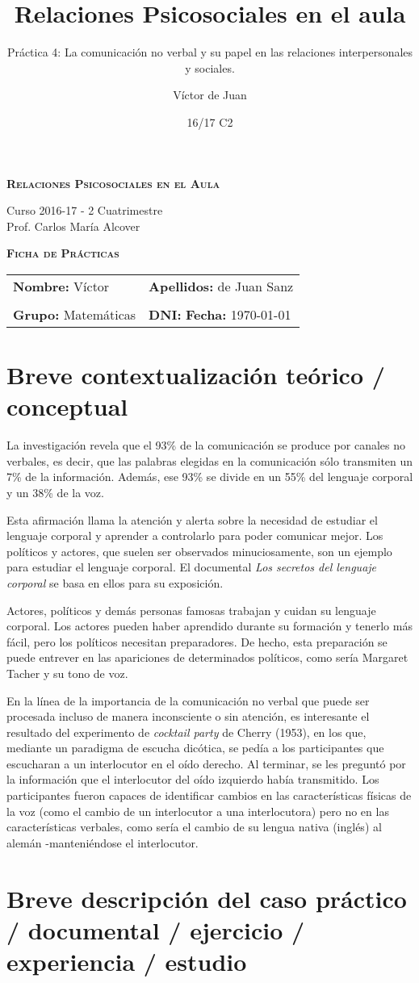\documentclass[palatino,nochap]{apuntesURJC}
\title{Relaciones Psicosociales en el aula}
\subtitle{Práctica 4: La comunicación no verbal y su papel en las relaciones interpersonales y sociales.}
\author{Víctor de Juan}
\date{16/17 C2}
\newcommand{\makeheader}[1]{
\begin{center}
\Large \textbf{\textsc{Relaciones Psicosociales en el Aula}}\\
\end{center}
\begin{center}
\large Curso 2016-17 - 2 Cuatrimestre\\
Prof. Carlos María Alcover
\end{center}

\begin{center}
\Large \textbf{\textsc{Ficha de Prácticas}}
\end{center}

\begin{center}
\begin{tabular}{ll}
\hspace{2cm}\textbf{Nombre:} Víctor &  \hspace{1.5cm} \textbf{Apellidos:} de Juan Sanz\\
\vspace{0.3cm}&\\
\textbf{Grupo:} Matemáticas 	& \textbf{DNI:} %
 \hspace{3cm} \textbf{Fecha:} #1
\end{tabular}
\end{center}
}
\begin{document}
\pagestyle{plain}
\maketitle

\makeheader{\today}

\section{Breve contextualización teórico / conceptual}
\label{intro}

La investigación revela que el 93\% de la comunicación se produce por canales no verbales, es decir, que las palabras elegidas en la comunicación sólo transmiten un 7\% de la información.
%
Además, ese 93\% se divide en un 55\% del lenguaje corporal y un 38\% de la voz.

Esta afirmación llama la atención y alerta sobre la necesidad de estudiar el lenguaje corporal y aprender a controlarlo para poder comunicar mejor.
%
Los políticos y actores, que suelen ser observados minuciosamente, son un ejemplo para estudiar el lenguaje corporal.
%
El documental \textit{Los secretos del lenguaje corporal} se basa en ellos para su exposición.

Actores, políticos y demás personas famosas trabajan y cuidan su lenguaje corporal.
%
Los actores pueden haber aprendido durante su formación y tenerlo más fácil, pero los políticos necesitan preparadores.
%
De hecho, esta preparación se puede entrever en las apariciones de determinados políticos, como sería Margaret Tacher y su tono de voz.

En la línea de la importancia de la comunicación no verbal que puede ser procesada incluso de manera inconsciente o sin atención, es interesante el resultado del experimento de \textit{cocktail party} de Cherry (1953), en los que, mediante un paradigma de escucha dicótica, se pedía a los participantes que escucharan a un interlocutor en el oído derecho.
%
Al terminar, se les preguntó por la información que el interlocutor del oído izquierdo había transmitido.
%
Los participantes fueron capaces de identificar cambios en las características físicas de la voz (como el cambio de un interlocutor a una interlocutora) pero no en las características verbales, como sería el cambio de su lengua nativa (inglés) al alemán -manteniéndose el interlocutor.

\section{Breve descripción del caso práctico / documental / ejercicio / experiencia / estudio}
\end{document}
